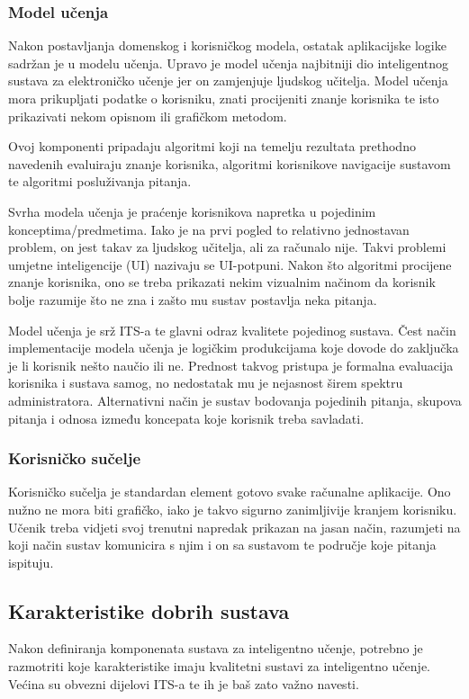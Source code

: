 \documentclass[times, utf8, zavrsni, numeric]{fer}
\begin{document}
\subsubsection{Model učenja}
Nakon postavljanja domenskog i korisničkog modela, ostatak aplikacijske logike sadržan je u modelu učenja. Upravo je model učenja najbitniji dio inteligentnog sustava za elektroničko učenje jer on zamjenjuje ljudskog učitelja. Model učenja mora prikupljati podatke o korisniku, znati procijeniti znanje korisnika te isto prikazivati nekom opisnom ili grafičkom metodom.\cite{markurban}
\par
Ovoj komponenti pripadaju algoritmi koji na temelju rezultata prethodno navedenih evaluiraju znanje korisnika, algoritmi korisnikove navigacije sustavom te algoritmi posluživanja pitanja.
\par
Svrha modela učenja je praćenje korisnikova napretka u pojedinim konceptima/predmetima. Iako je na prvi pogled to relativno jednostavan problem, on jest takav za ljudskog učitelja, ali za računalo nije. Takvi problemi umjetne inteligencije (UI) nazivaju se UI-potpuni. Nakon što algoritmi procijene znanje korisnika, ono se treba prikazati nekim vizualnim načinom da korisnik bolje razumije što ne zna i zašto mu sustav postavlja neka pitanja.
\par
Model učenja je srž ITS-a te glavni odraz kvalitete pojedinog sustava. Čest način implementacije modela učenja je logičkim produkcijama koje dovode do zaključka je li korisnik nešto naučio ili ne.\cite{zhenzhai} Prednost takvog pristupa je formalna evaluacija korisnika i sustava samog, no nedostatak mu je nejasnost širem spektru administratora. Alternativni način je sustav bodovanja pojedinih pitanja, skupova pitanja i odnosa između koncepata koje korisnik treba savladati.

\subsubsection{Korisničko sučelje}
Korisničko sučelja je standardan element gotovo svake računalne aplikacije. Ono nužno ne mora biti grafičko, iako je takvo sigurno zanimljivije kranjem korisniku. Učenik treba vidjeti svoj trenutni napredak prikazan na jasan način, razumjeti na koji način sustav komunicira s njim i on sa sustavom te područje koje pitanja ispituju.

\subsection{Karakteristike dobrih sustava}
Nakon definiranja komponenata sustava za inteligentno učenje, potrebno je razmotriti koje karakteristike imaju kvalitetni sustavi za inteligentno učenje. Većina su obvezni dijelovi ITS-a te ih je baš zato važno navesti.
\end{document}
